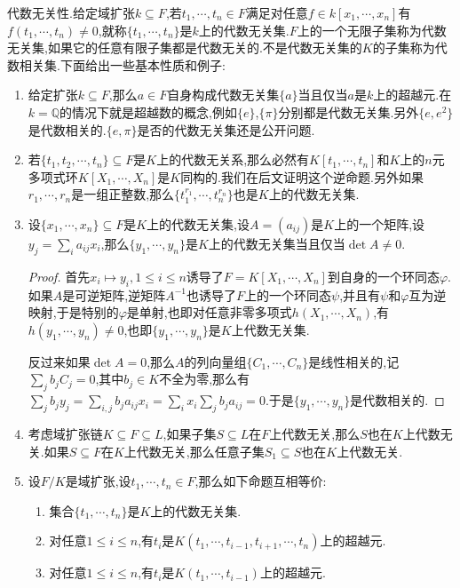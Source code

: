 代数无关性.给定域扩张$k\subseteq F$,若$t_1,\cdots,t_n\in F$满足对任意$f\in k[x_1,\cdots,x_n]$有$f(t_1,\cdots,t_n)\not=0$,就称$\{t_1,\cdots,t_n\}$是$k$上的代数无关集.$F$上的一个无限子集称为代数无关集,如果它的任意有限子集都是代数无关的.不是代数无关集的$K$的子集称为代数相关集.下面给出一些基本性质和例子:
\begin{enumerate}
	\item 给定扩张$k\subseteq F$,那么$a\in F$自身构成代数无关集$\{a\}$当且仅当$a$是$k$上的超越元.在$k=\mathbb{Q}$的情况下就是超越数的概念,例如$\{e\}$,$\{\pi\}$分别都是代数无关集.另外$\{e,e^2\}$是代数相关的.$\{e,\pi\}$是否的代数无关集还是公开问题.
	\item 若$\{t_1,t_2,\cdots,t_n\}\subseteq F$是$K$上的代数无关系,那么必然有$K[t_1,\cdots,t_n]$和$K$上的$n$元多项式环$K[X_1,\cdots,X_n]$是$K$同构的.我们在后文证明这个逆命题.另外如果$r_1,\cdots,r_n$是一组正整数,那么$\{t_1^{r_1},\cdots,t_n^{r_n}\}$也是$K$上的代数无关集.
	\item 设$\{x_1,\cdots,x_n\}\subseteq F$是$K$上的代数无关集,设$A=(a_{ij})$是$K$上的一个矩阵,设$y_j=\sum_ia_{ij}x_i$,那么$\{y_1,\cdots,y_n\}$是$K$上的代数无关集当且仅当$\det A\not=0$.
	\begin{proof}
		
		首先$x_i\mapsto y_i,1\le i\le n$诱导了$F=K[X_1,\cdots,X_n]$到自身的一个环同态$\varphi$.如果$A$是可逆矩阵,逆矩阵$A^{-1}$也诱导了$F$上的一个环同态$\psi$,并且有$\psi$和$\varphi$互为逆映射,于是特别的$\varphi$是单射,也即对任意非零多项式$h(X_1,\cdots,X_n)$,有$h(y_1,\cdots,y_n)\not=0$,也即$\{y_1,\cdots,y_n\}$是$K$上代数无关集.
		
		\qquad
		
		反过来如果$\det A=0$,那么$A$的列向量组$\{C_1,\cdots,C_n\}$是线性相关的,记$\sum_jb_jC_j=0$,其中$b_j\in K$不全为零,那么有$\sum_jb_jy_j=\sum_{i,j}b_ja_{ij}x_i=\sum_ix_i\sum_jb_ja_{ij}=0$.于是$\{y_1,\cdots,y_n\}$是代数相关的.
	\end{proof}
	\item 考虑域扩张链$K\subseteq F\subseteq L$,如果子集$S\subseteq L$在$F$上代数无关,那么$S$也在$K$上代数无关.如果$S\subseteq F$在$K$上代数无关,那么任意子集$S_1\subseteq S$也在$K$上代数无关.
    \item 设$F/K$是域扩张,设$t_1,\cdots,t_n\in F$,那么如下命题互相等价:
    \begin{enumerate}
    	\item 集合$\{t_1,\cdots,t_n\}$是$K$上的代数无关集.
    	\item 对任意$1\le i\le n$,有$t_i$是$K(t_1,\cdots,t_{i-1},t_{i+1},\cdots,t_n)$上的超越元.
    	\item 对任意$1\le i\le n$,有$t_i$是$K(t_1,\cdots,t_{i-1})$上的超越元.
    \end{enumerate}


\end{enumerate}
